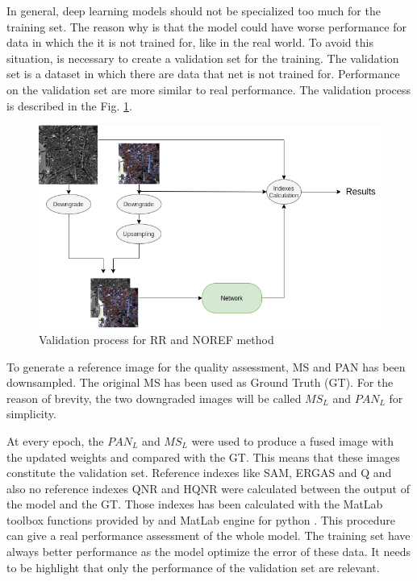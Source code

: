 \documentclass[12pt]{report}
\begin{document}
In general, deep learning models should not be specialized too much for the training set.
The reason why is that the model could have worse performance for data in which the it is not trained for,
like in the real world.
To avoid this situation, is necessary to create a validation set for the training. The validation set is a dataset
in which there are data that net is not trained for. Performance on the validation set are more similar to real performance.
The validation process is described in the Fig. \ref{fig:validation}.

\begin{figure}[t]
    \centering
    \includegraphics[scale=.5]{validation.png}
    \caption{Validation process for RR and NOREF method}
    \label{fig:validation}
\end{figure}

To generate a reference image for the quality assessment, MS and PAN has been downsampled.
The original MS has been used as Ground Truth (GT).
For the reason of brevity, the two downgraded images will be called $MS_L$ and $PAN_L$ for simplicity.

At every epoch, the $PAN_L$ and $MS_L$ were used 
to produce a fused image with the updated weights and compared with the GT.
This means that these images constitute the validation set. 
Reference indexes like SAM, ERGAS and Q and also no reference indexes QNR and HQNR were calculated between the output of the model and the GT.
Those indexes has been calculated with the MatLab toolbox functions provided by \cite{criticalComparison} and MatLab engine 
for python \cite{matlab}.
This procedure can give a real performance assessment of the whole model.
The training set have always better performance as the model optimize the 
error of these data. It needs to be highlight that only the performance of the validation set are relevant. 
\end{document}
